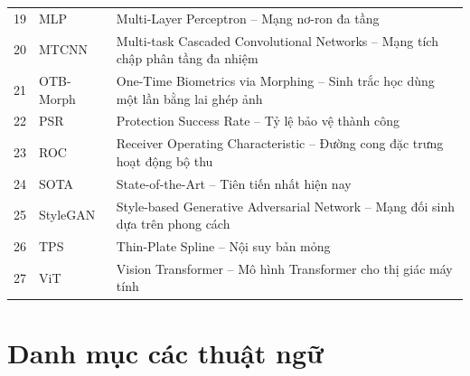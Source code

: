 {\begin{longtable}{r l >{\raggedright\arraybackslash}p{10.6cm}}
19 & MLP & Multi-Layer Perceptron -- Mạng nơ-ron đa tầng \\
20 & MTCNN & Multi-task Cascaded Convolutional Networks -- Mạng tích chập phân tầng đa nhiệm \\
21 & OTB-Morph & One-Time Biometrics via Morphing -- Sinh trắc học dùng một lần bằng lai ghép ảnh \\
22 & PSR & Protection Success Rate -- Tỷ lệ bảo vệ thành công \\
23 & ROC & Receiver Operating Characteristic -- Đường cong đặc trưng hoạt động bộ thu \\
24 & SOTA & State-of-the-Art -- Tiên tiến nhất hiện nay \\
25 & StyleGAN & Style-based Generative Adversarial Network -- Mạng đối sinh dựa trên phong cách \\
26 & TPS & Thin-Plate Spline -- Nội suy bản mỏng \\
27 & ViT & Vision Transformer -- Mô hình Transformer cho thị giác máy tính \\
\end{longtable}
\addtocounter{table}{-1}
}

\cleardoublepage
\chapter*{Danh mục các thuật ngữ}

